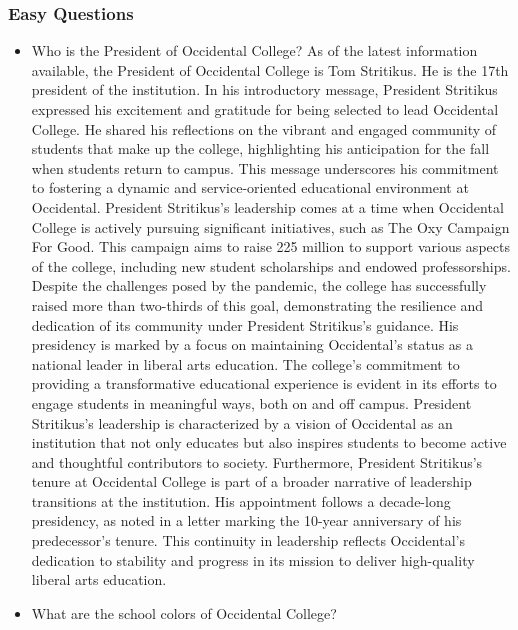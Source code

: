\documentclass[10pt,twocolumn]{article}
\begin{document}
\subsubsection{Easy Questions}
\begin{itemize}
\item Who is the President of Occidental College? \newline
\indent As of the latest information available, the President of Occidental College is Tom Stritikus. He is the 17th president of the institution. In his introductory message, President Stritikus expressed his excitement and gratitude for being selected to lead Occidental College. He shared his reflections on the vibrant and engaged community of students that make up the college, highlighting his anticipation for the fall when students return to campus. This message underscores his commitment to fostering a dynamic and service-oriented educational environment at Occidental.
\newline
\indent President Stritikus's leadership comes at a time when Occidental College is actively pursuing significant initiatives, such as The Oxy Campaign For Good. This campaign aims to raise 225 million to support various aspects of the college, including new student scholarships and endowed professorships. Despite the challenges posed by the pandemic, the college has successfully raised more than two-thirds of this goal, demonstrating the resilience and dedication of its community under President Stritikus's guidance.
\newline
\indent His presidency is marked by a focus on maintaining Occidental's status as a national leader in liberal arts education. The college's commitment to providing a transformative educational experience is evident in its efforts to engage students in meaningful ways, both on and off campus. President Stritikus's leadership is characterized by a vision of Occidental as an institution that not only educates but also inspires students to become active and thoughtful contributors to society.
\indent Furthermore, President Stritikus's tenure at Occidental College is part of a broader narrative of leadership transitions at the institution. His appointment follows a decade-long presidency, as noted in a letter marking the 10-year anniversary of his predecessor's tenure. This continuity in leadership reflects Occidental's dedication to stability and progress in its mission to deliver high-quality liberal arts education.
\newline
\item What are the school colors of Occidental College? \newline

\end{itemize}
\end{document}
